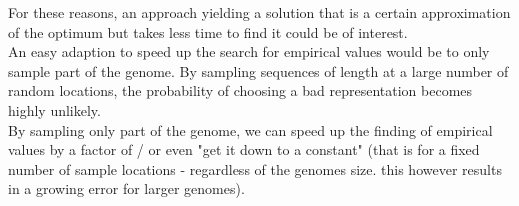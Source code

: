 \documentclass{article}
\begin{document}
For these reasons, an approach yielding a solution that is a certain approximation of the optimum but takes less time to find it could be of interest.\\
An easy adaption  to speed up the search for empirical values would be to only sample part of the genome. By sampling sequences of length  at a large  number of random locations, the probability of choosing a bad representation becomes highly unlikely.\\
By sampling only part of the genome, we can speed up the finding of empirical values by a factor of  / or even "get it down to a constant" (that is for a fixed number of sample locations - regardless of the genomes size. this however results in a growing error for larger genomes).\\
\end{document}
